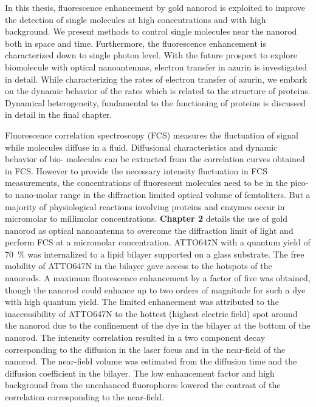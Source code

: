 In this thesis, fluorescence enhancement by gold nanorod is exploited to improve the detection of single molecules at high concentrations and with high background.
We present methods to control single molecules near the nanorod both in space and time.
Furthermore, the fluorescence enhancement is characterized down to single photon level.
With the future prospect to explore biomolecule with optical nanoantennas, electron transfer in azurin is investigated in detail.
While characterizing the rates of electron transfer of azurin, we embark on the dynamic behavior of the rates which is related to the structure of proteins.
Dynamical heterogeneity, fundamental to the functioning of proteins is discussed in detail in the final chapter.

Fluorescence correlation spectroscopy (FCS) measures the fluctuation of signal while molecules diffuse in a fluid.
Diffusional characteristics and dynamic behavior of bio- molecules can be extracted from the correlation curves obtained in FCS.
However to provide the necessary intensity fluctuation in FCS measurements, the concentrations of fluorescent molecules need to be in the pico- to nano-molar range in the diffraction limited optical volume of femtoliters.
But a majority of physiological reactions involving proteins and enzymes occur in micromolar to millimolar concentrations. 
\textbf{Chapter 2} details the use of gold nanorod as optical nanoantenna to overcome the diffraction limit of light and perform FCS at a micromolar concentration.
ATTO647N with a quantum yield of \SI{70}{\percent} was internalized to a lipid bilayer supported on a glass substrate.
The free mobility of ATTO647N in the bilayer gave access to the hotspots of the nanorods.
A maximum fluorescence enhancement by a factor of five was obtained, though the nanorod could enhance up to two orders of magnitude for such a dye with high quantum yield.
The limited enhancement was attributed to the inaccessibility of ATTO647N to the hottest (highest electric field) spot around the nanorod due to the confinement of the dye in the bilayer at the bottom of the nanorod.
The intensity correlation resulted in a two component decay corresponding to the diffusion in the laser focus and in the near-field of the nanorod.
The near-field volume was estimated from the diffusion time and the diffusion coefficient in the bilayer.
The low enhancement factor and high background from the unenhanced fluorophores lowered the contrast of the correlation corresponding to the near-field.
